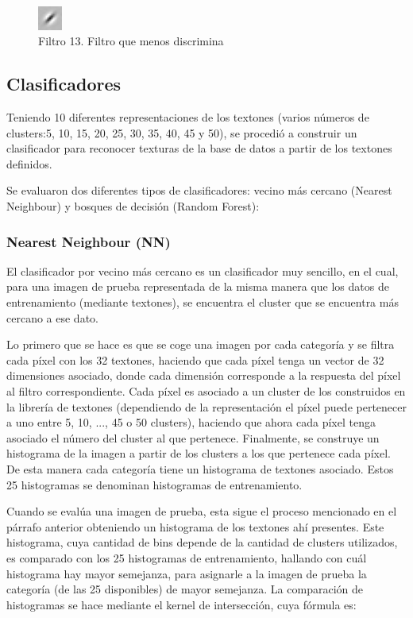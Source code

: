 \documentclass[10pt,twocolumn,letterpaper]{article}
\begin{document}
\begin{figure}[h]
    \centering
    \includegraphics[width=0.07\textwidth]{Filtro13.jpg}
    \caption{Filtro 13. Filtro que menos discrimina}
    \label{fig:filtro 13}
\end{figure}

\subsection{Clasificadores}
Teniendo 10 diferentes representaciones de los textones (varios números de clusters:5, 10, 15, 20, 25, 30, 35, 40, 45 y 50), se procedió a construir un clasificador para reconocer texturas de la base de datos a partir de los textones definidos. 

Se evaluaron dos diferentes tipos de clasificadores: vecino más cercano (Nearest Neighbour) y bosques de decisión (Random Forest):

\subsubsection{Nearest Neighbour (NN)}
El clasificador por vecino más cercano es un clasificador muy sencillo, en el cual, para una imagen de prueba representada de la misma manera que los datos de entrenamiento (mediante textones), se encuentra el cluster que se encuentra más cercano a ese dato.

Lo primero que se hace es que se coge una imagen por cada categoría y se filtra cada píxel con los 32 textones, haciendo que cada píxel tenga un vector de 32 dimensiones asociado, donde cada dimensión corresponde a la respuesta del píxel al filtro correspondiente. Cada píxel es asociado a un cluster de los construidos en la librería de textones (dependiendo de la representación el píxel puede pertenecer a uno entre 5, 10, ..., 45 o 50 clusters), haciendo que ahora cada píxel tenga asociado el número del cluster al que pertenece. Finalmente, se construye un histograma de la imagen a partir de los clusters a los que pertenece cada píxel. De esta manera cada categoría tiene un histograma de textones asociado. Estos 25 histogramas se denominan histogramas de entrenamiento.

Cuando se evalúa una imagen de prueba, esta sigue el proceso mencionado en el párrafo anterior obteniendo un histograma de los textones ahí presentes. Este histograma, cuya cantidad de bins depende de la cantidad de clusters utilizados, es comparado con los 25 histogramas de entrenamiento, hallando con cuál histograma hay mayor semejanza, para asignarle a la imagen de prueba la categoría (de las 25 disponibles) de mayor semejanza. La comparación de histogramas se hace mediante el kernel de intersección, cuya fórmula es: 
\end{document}
